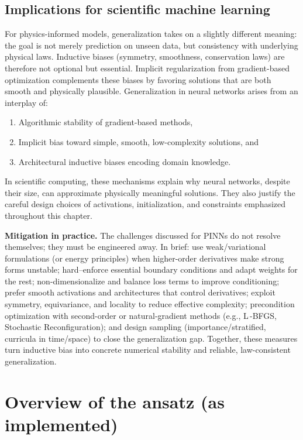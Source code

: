 \documentclass[superscriptaddress,unsortedaddress,amsmath,amssymb,aps]{revtex4-2}
\begin{document}
\subsection{Implications for scientific machine learning}
For physics-informed models, generalization takes on a slightly different meaning: 
the goal is not merely prediction on unseen data, but consistency with 
underlying physical laws. Inductive biases (symmetry, smoothness, conservation laws) 
are therefore not optional but essential. Implicit regularization from 
gradient-based optimization complements these biases by favoring solutions 
that are both smooth and physically plausible. Generalization in neural networks arises from an interplay of:
\begin{enumerate}
  \item Algorithmic stability of gradient-based methods,  
  \item Implicit bias toward simple, smooth, low-complexity solutions, and  
  \item Architectural inductive biases encoding domain knowledge.  
\end{enumerate}
In scientific computing, these mechanisms explain why neural networks, 
despite their size, can approximate physically meaningful solutions.  
They also justify the careful design choices of activations, initialization, 
and constraints emphasized throughout this chapter.  

\medskip
\noindent\textbf{Mitigation in practice.}
The challenges discussed for PINNs do not resolve themselves; they must be engineered away. 
In brief: use weak/variational formulations (or energy principles) when higher-order derivatives make strong forms unstable; 
hard–enforce essential boundary conditions and adapt weights for the rest; 
non-dimensionalize and balance loss terms to improve conditioning; 
prefer smooth activations and architectures that control derivatives; 
exploit symmetry, equivariance, and locality to reduce effective complexity; 
precondition optimization with second-order or natural-gradient methods (e.g., L\,-BFGS, Stochastic Reconfiguration); 
and design sampling (importance/stratified, curricula in time/space) to close the generalization gap. 
Together, these measures turn inductive bias into concrete numerical stability and reliable, law-consistent generalization.
\section{Overview of the ansatz (as implemented)}
\label{sec:ansatz}
\end{document}
